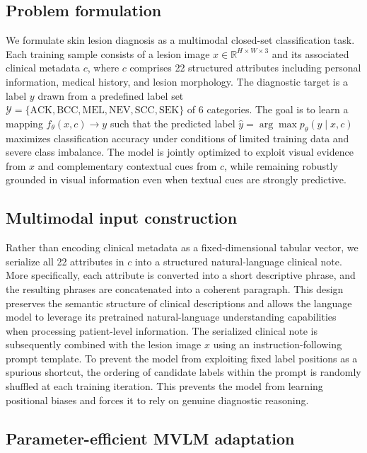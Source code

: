 \documentclass[preprint,12pt]{elsarticle}
\makeatletter
\def@NAT@last@yr{--\NAT@penalty}%
\makeatother
\begin{document}
\subsection{Problem formulation}

We formulate skin lesion diagnosis as a multimodal closed-set classification task. Each training sample consists of a lesion image $x \in \mathbb{R}^{H \times W \times 3}$ and its associated clinical metadata $c$, where $c$ comprises 22 structured attributes including personal information, medical history, and lesion morphology. The diagnostic target is a label $y$ drawn from a predefined label set $\mathcal{Y} = \{\text{ACK}, \text{BCC}, \text{MEL}, \text{NEV}, \text{SCC}, \text{SEK}\}$ of 6 categories. The goal is to learn a mapping $f_\theta(x, c) \rightarrow y$ such that the predicted label $\hat{y} = \arg \max p_\theta(y \mid x, c)$ maximizes classification accuracy under conditions of limited training data and severe class imbalance. The model is jointly optimized to exploit visual evidence from $x$ and complementary contextual cues from $c$, while remaining robustly grounded in visual information even when textual cues are strongly predictive.



\subsection{Multimodal input construction}
Rather than encoding clinical metadata as a fixed-dimensional tabular vector, we serialize all 22 attributes in $c$ into a structured natural-language clinical note. More specifically, each attribute is converted into a short descriptive phrase, and the resulting phrases are concatenated into a coherent paragraph. This design preserves the semantic structure of clinical descriptions and allows the language model to leverage its pretrained natural-language understanding capabilities when processing patient-level information. The serialized clinical note is subsequently combined with the lesion image $x$ using an instruction-following prompt template. To prevent the model from exploiting fixed label positions as a spurious shortcut, the ordering of candidate labels within the prompt is randomly shuffled at each training iteration. This prevents the model from learning positional biases and forces it to rely on genuine diagnostic reasoning.

\subsection{Parameter-efficient MVLM adaptation}
\end{document}
